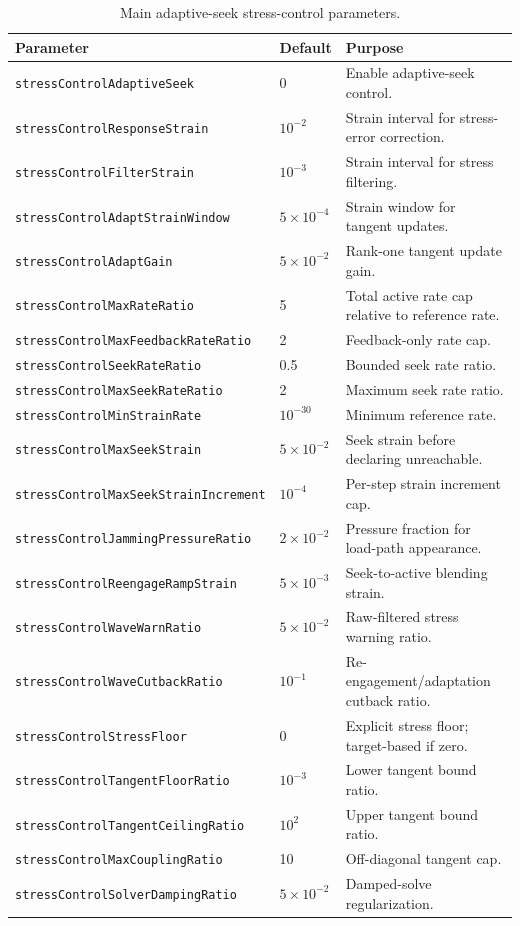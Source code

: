 \begin{table}[h]
\centering
\caption{Main adaptive-seek stress-control parameters.}
\label{tab:bc-adaptive-seek-parameters}
\begin{tabular}{lll}
\toprule
Parameter & Default & Purpose \\
\midrule
\texttt{stressControlAdaptiveSeek} & 0 & Enable adaptive-seek control. \\
\texttt{stressControlResponseStrain} & $10^{-2}$ & Strain interval for stress-error correction. \\
\texttt{stressControlFilterStrain} & $10^{-3}$ & Strain interval for stress filtering. \\
\texttt{stressControlAdaptStrainWindow} & $5\times10^{-4}$ & Strain window for tangent updates. \\
\texttt{stressControlAdaptGain} & $5\times10^{-2}$ & Rank-one tangent update gain. \\
\texttt{stressControlMaxRateRatio} & 5 & Total active rate cap relative to reference rate. \\
\texttt{stressControlMaxFeedbackRateRatio} & 2 & Feedback-only rate cap. \\
\texttt{stressControlSeekRateRatio} & 0.5 & Bounded seek rate ratio. \\
\texttt{stressControlMaxSeekRateRatio} & 2 & Maximum seek rate ratio. \\
\texttt{stressControlMinStrainRate} & $10^{-30}$ & Minimum reference rate. \\
\texttt{stressControlMaxSeekStrain} & $5\times10^{-2}$ & Seek strain before declaring unreachable. \\
\texttt{stressControlMaxSeekStrainIncrement} & $10^{-4}$ & Per-step strain increment cap. \\
\texttt{stressControlJammingPressureRatio} & $2\times10^{-2}$ & Pressure fraction for load-path appearance. \\
\texttt{stressControlReengageRampStrain} & $5\times10^{-3}$ & Seek-to-active blending strain. \\
\texttt{stressControlWaveWarnRatio} & $5\times10^{-2}$ & Raw-filtered stress warning ratio. \\
\texttt{stressControlWaveCutbackRatio} & $10^{-1}$ & Re-engagement/adaptation cutback ratio. \\
\texttt{stressControlStressFloor} & 0 & Explicit stress floor; target-based if zero. \\
\texttt{stressControlTangentFloorRatio} & $10^{-3}$ & Lower tangent bound ratio. \\
\texttt{stressControlTangentCeilingRatio} & $10^{2}$ & Upper tangent bound ratio. \\
\texttt{stressControlMaxCouplingRatio} & 10 & Off-diagonal tangent cap. \\
\texttt{stressControlSolverDampingRatio} & $5\times10^{-2}$ & Damped-solve regularization. \\
\bottomrule
\end{tabular}
\end{table}

